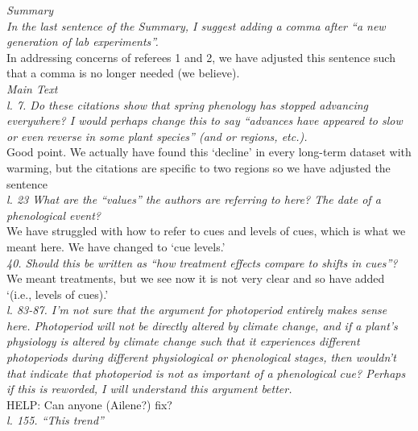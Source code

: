 \documentclass[11pt,letter]{article}
\begin{document}
\emph{Summary }\\

\emph{In the last sentence of the Summary, I suggest adding a comma after “a new generation of lab experiments”. }\\

In addressing concerns of referees 1 and 2, we have adjusted this sentence such that a comma is no longer needed (we believe).\\

\emph{Main Text }\\

\emph{l. 7. Do these citations show that spring phenology has stopped advancing everywhere? I would perhaps change this to say “advances have appeared to slow or even reverse in some plant species” (and or regions, etc.). }\\

Good point. We actually have found this `decline' in every long-term dataset with warming, but the citations are specific to two regions so we have adjusted the sentence\\

\emph{l. 23 What are the “values” the authors are referring to here? The date of a phenological event? }\\

We have struggled with how to refer to cues and levels of cues, which is what we meant here. We have changed to `cue levels.'\\

\emph{40. Should this be written as “how treatment effects compare to shifts in cues”? }\\

We meant treatments, but we see now it is not very clear and so have added `(i.e., levels of cues).'\\

\emph{l. 83-87. I’m not sure that the argument for photoperiod entirely makes sense here. Photoperiod will not be directly altered by climate change, and if a plant’s physiology is altered by climate change such that it experiences different photoperiods during different physiological or phenological stages, then wouldn’t that indicate that photoperiod is not as important of a phenological cue? Perhaps if this is reworded, I will understand this argument better. }\\

HELP: Can anyone (Ailene?) fix?\\

\emph{l. 155. “This trend”}\\
\end{document}
